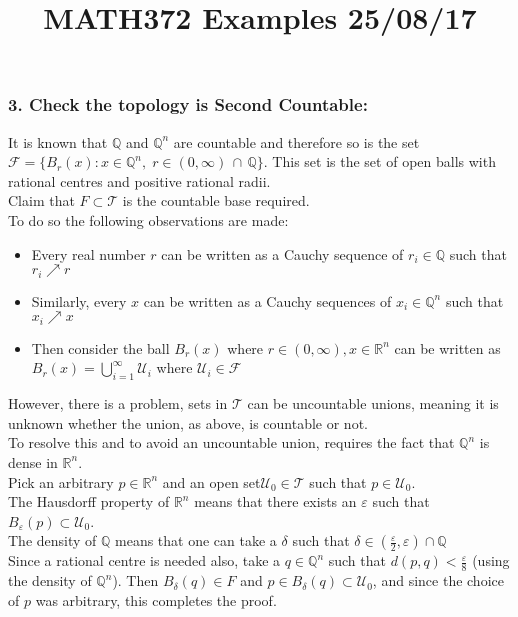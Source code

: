 \documentclass[11pt]{article}
\title{MATH372 Examples	 25/08/17}
\author{}
\date{}
\theoremstyle{thm}
\begin{document}
\maketitle
\subsubsection{3. Check the topology is Second Countable:}
It is known that $\mathbb{Q}$ and $\mathbb{Q}^n$ are countable and therefore so 
is the set $\mathcal{F}=\{B_r(x): x \in \mathbb{Q}^n,\; r\in 
(0,\infty)\,\cap\,\mathbb{Q} \}$. This set is the set of open balls with 
rational centres and positive rational radii.\\[1em]
Claim that $F\subset \mathcal{T}$ is the countable base required.\\[1em]
To do so the following observations are made:
\begin{itemize}
	\item Every real number $r$ can be written as a Cauchy sequence of $r_i\in \mathbb{Q}$ such that $r_i \nearrow r$
	\item Similarly, every $x$ can be written as a Cauchy sequences of $x_i\in \mathbb{Q}^n $ such that $x_i \nearrow x$
	\item Then consider the ball $B_r(x)$ where $r\in (0,\infty), x\in \mathbb{R}^n$ can be written as $B_r(x)=\bigcup\limits_{i=1}^{\infty}{\mathcal{U}_i}$ where $\mathcal{U}_i \in \mathcal{F}$
\end{itemize}
However, there is a problem, sets in $\mathcal{T}$ can be uncountable unions, 
meaning it is unknown whether the union, as above, is countable or not.\\[1em] 
To resolve this and to avoid an uncountable union, requires the fact that 
$\mathbb{Q}^n$ is dense in $\mathbb{R}^n$.\\[1em]
Pick an arbitrary $p\in \mathbb{R}^n$ and an open set$ \mathcal{U}_0 \in 
\mathcal{T}$ such that $p\in \mathcal{U}_0$.\\[1em]
The Hausdorff property of $\mathbb{R}^n$ means that there exists an $\varepsilon$ such that $B_\varepsilon(p) \subset \mathcal{U}_0$.\\[1em]
The density of $\mathbb{Q}$ means that one can take a $\delta$ such that $\delta \in  (\frac{\varepsilon}{2},\varepsilon) \cap \mathbb{Q}$\\[1em]
Since a rational centre is needed also, take a $q \in \mathbb{Q}^n$ such that $d(p,q)<\displaystyle\frac{\varepsilon}{8}$ (using the density of $\mathbb{Q}^n$).
Then $B_\delta(q) \in F$ and $p\in B_\delta(q)\subset \mathcal{U}_0$, and since 
the choice of $p$ was arbitrary, this completes the proof.
\end{document}
